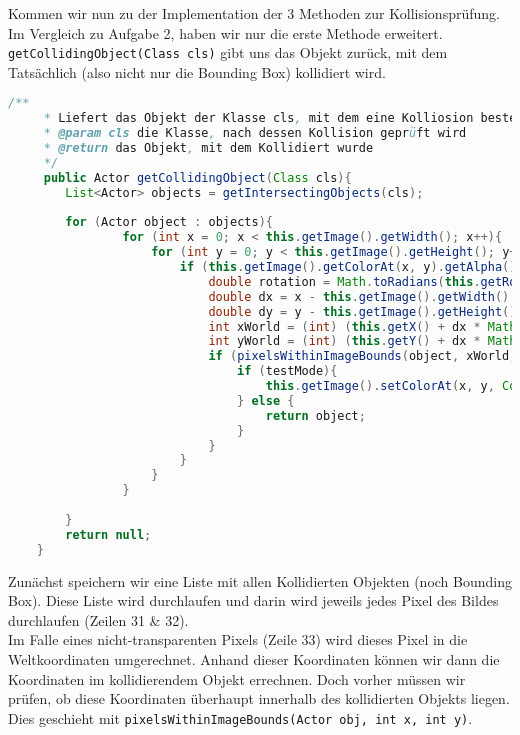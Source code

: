 \documentclass{pi1}
\begin{document}
Kommen wir nun zu der Implementation der 3 Methoden zur Kollisionsprüfung.
Im Vergleich zu Aufgabe 2, haben wir nur die erste Methode erweitert.\\
\texttt{getCollidingObject(Class cls)} gibt uns das Objekt zurück, mit dem Tatsächlich (also nicht nur die Bounding Box) kollidiert wird.

\begin{lstlisting}[caption={\emph{getCollidingObject(Class cls)}-Methode}, firstnumber=22, language=Java]
/**
     * Liefert das Objekt der Klasse cls, mit dem eine Kolliosion besteht.
     * @param cls die Klasse, nach dessen Kollision geprüft wird
     * @return das Objekt, mit dem Kollidiert wurde
     */
     public Actor getCollidingObject(Class cls){
        List<Actor> objects = getIntersectingObjects(cls);
        
        for (Actor object : objects){
                for (int x = 0; x < this.getImage().getWidth(); x++){
                    for (int y = 0; y < this.getImage().getHeight(); y++){
                        if (this.getImage().getColorAt(x, y).getAlpha() > 0){
                            double rotation = Math.toRadians(this.getRotation());
                            double dx = x - this.getImage().getWidth() / 2;
                            double dy = y - this.getImage().getHeight() / 2;
                            int xWorld = (int) (this.getX() + dx * Math.cos(rotation) - dy * Math.sin(rotation));
                            int yWorld = (int) (this.getY() + dx * Math.sin(rotation) + dy * Math.cos(rotation));
                            if (pixelsWithinImageBounds(object, xWorld, yWorld) && visiblePixelAt(xWorld, yWorld, object)){
                                if (testMode){
                                    this.getImage().setColorAt(x, y, Color.RED);
                                } else {
                                    return object;
                                }
                            }                            
                        }
                    }
                }
            
        }
        return null;
    }
\end{lstlisting}

Zunächst speichern wir eine Liste mit allen Kollidierten Objekten (noch Bounding Box). Diese Liste wird durchlaufen und darin wird jeweils jedes Pixel des Bildes durchlaufen (Zeilen 31 \& 32).\\
Im Falle eines nicht-transparenten Pixels (Zeile 33) wird dieses Pixel in die Weltkoordinaten umgerechnet. Anhand dieser Koordinaten können wir dann die Koordinaten im kollidierendem Objekt errechnen. Doch vorher müssen wir prüfen, ob diese Koordinaten überhaupt innerhalb des kollidierten Objekts liegen. Dies geschieht mit \texttt{pixelsWithinImageBounds(Actor obj, int x, int y)}.
\end{document}
